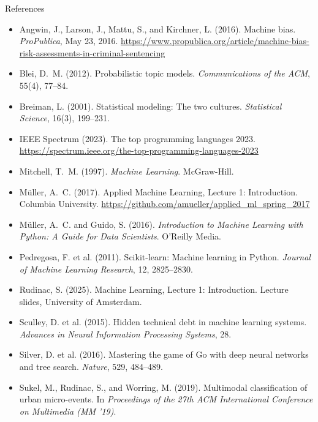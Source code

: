 \documentclass[handout,aspectratio=169,t,9pt]{beamer}
\begin{document}
\begin{frame}{References}
  \scriptsize
  \begin{itemize}
    \item Angwin, J., Larson, J., Mattu, S., and Kirchner, L. (2016).
          Machine bias.  \emph{ProPublica}, May 23, 2016.
          \url{https://www.propublica.org/article/machine-bias-risk-assessments-in-criminal-sentencing}
    \item Blei, D.~M. (2012).  Probabilistic topic models.
          \emph{Communications of the ACM}, 55(4), 77--84.
    \item Breiman, L. (2001).  Statistical modeling: The two cultures.
          \emph{Statistical Science}, 16(3), 199--231.
    \item IEEE Spectrum (2023).  The top programming languages 2023.
          \url{https://spectrum.ieee.org/the-top-programming-languages-2023}
    \item Mitchell, T.~M. (1997).  \emph{Machine Learning}.  McGraw-Hill.
    \item M\"{u}ller, A.~C. (2017).  Applied Machine Learning, Lecture 1:
          Introduction.  Columbia University.
          \url{https://github.com/amueller/applied_ml_spring_2017}
    \item M\"{u}ller, A.~C. and Guido, S. (2016).  \emph{Introduction to
          Machine Learning with Python: A Guide for Data Scientists}.
          O'Reilly Media.
    \item Pedregosa, F. et al. (2011).  Scikit-learn: Machine learning in
          Python.  \emph{Journal of Machine Learning Research}, 12,
          2825--2830.
    \item Rudinac, S. (2025).  Machine Learning, Lecture 1: Introduction.
          Lecture slides, University of Amsterdam.
    \item Sculley, D. et al. (2015).  Hidden technical debt in machine
          learning systems.  \emph{Advances in Neural Information
          Processing Systems}, 28.
    \item Silver, D. et al. (2016).  Mastering the game of Go with deep
          neural networks and tree search.  \emph{Nature}, 529, 484--489.
    \item Sukel, M., Rudinac, S., and Worring, M. (2019).  Multimodal
          classification of urban micro-events.  In \emph{Proceedings of
          the 27th ACM International Conference on Multimedia (MM '19)}.
  \end{itemize}
\end{frame}
\end{document}
